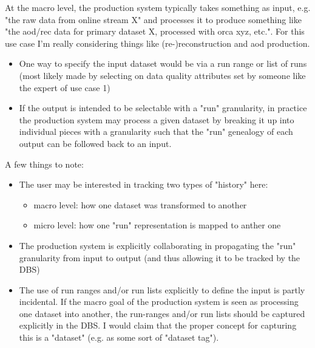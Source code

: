 \documentclass{cmspaper}
\begin{document}
  At the macro level, the production system typically takes something 
as input, e.g. "the raw data from online stream X" and processes it to
produce something like "the aod/rec data for primary dataset X, processed
with orca xyz, etc.". For this use case I'm really considering things
like (re-)reconstruction and aod production.


\begin{itemize}
\item One way to specify the input dataset would be via a run range or list
     of runs (most likely made by selecting on data quality attributes set by
     someone like the expert of use case 1)
\item If the output is intended to be selectable with a "run" granularity,
     in practice the production system may process a given dataset by 
     breaking it up into individual pieces with a granularity such that
     the "run" genealogy of each output can be followed back to an input.
\end{itemize}

  A few things to note:
\begin{itemize}

\item The user may be interested in tracking two types of "history" here:
\begin{itemize}

      \item macro level: how one dataset was transformed to another
      \item micro level: how one "run" representation is mapped to anther one
\end{itemize}

\item The production system is explicitly collaborating in propagating the
    "run" granularity from input to output (and thus allowing it to be
    tracked by the DBS)

\item The use of run ranges and/or run lists explicitly to define the input is 
    partly incidental. If the macro goal of the production system is seen as
    processing one dataset into another, the run-ranges and/or run lists 
    should be captured explicitly in the DBS. I would claim that the proper 
    concept for capturing this is a "dataset" (e.g. as some sort of "dataset 
    tag"). 

\end{itemize}
\end{document}
